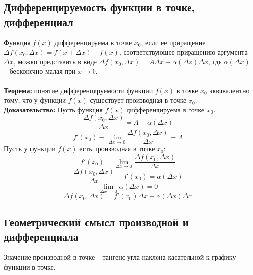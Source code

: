 \documentclass{article}
\newcommand{\theorem}{\textbf{Теорема:} }
\newcommand{\proof}{\textbf{Доказательство:} }
\begin{document}
    \subsection*{Дифференцируемость функции в точке, дифференциал}
        Функция $f(x)$ дифференцируема в точке $x_0$, если ее приращение $\Delta f(x_0, \Delta x) = f(x + \Delta x) - f(x)$, соответствующее приращению
        аргумента $\Delta x$, можно представить в виде $ \Delta f(x_0, \Delta x) = A \Delta x + \alpha(\Delta x) \Delta x $, где $\alpha(\Delta x)$ -- бесконечно малая при
        $ x \to 0 $.
        \\
        \\
        \theorem понятие дифференцируемости функции $f(x)$ в точке $x_0$ эквивалентно тому, что у функции $f(x)$ существует производная в точке $x_0$.
        \\
        \proof
        Пусть функция $f(x)$ дифференцируема в точке $x_0$:
        \[ \frac{\Delta f(x_0, \Delta x)}{\Delta x} = A + \alpha(\Delta x) \]
        \[ f'(x_0) = \lim_{\Delta x \to 0} \frac{\Delta f(x_0, \Delta x)}{\Delta x} = A \]
        Пусть у функции $f(x)$ есть производная в точке $x_0$:
        \[ f'(x_0) = \lim_{\Delta x \to 0} \frac{\Delta f(x_0, \Delta x)}{\Delta x} \]
        \[ \frac{\Delta f(x_0, \Delta x)}{\Delta x} - f'(x_0) = \alpha(\Delta x) \]
        \[ \lim_{\Delta x \to 0} \alpha(\Delta x) = 0 \]
        \[ \Delta f(x_0, \Delta x) = f'(x_0) \Delta x + \alpha(\Delta x) \Delta x \]


    \subsection*{Геометрический смысл производной и дифференциала}
        Значение производной в точке -- тангенс угла наклона касательной к графику функции в точке.
        
\end{document}
